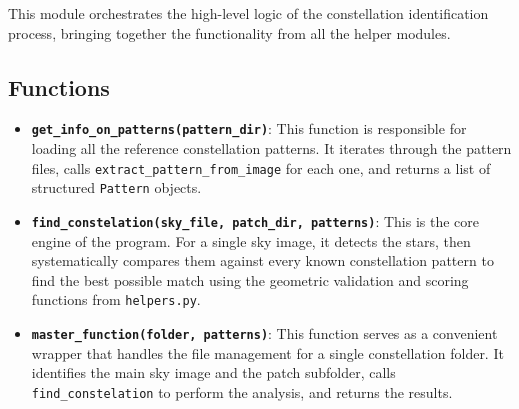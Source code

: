 \documentclass[a4paper,11pt]{article}
\begin{document}
This module orchestrates the high-level logic of the constellation identification process, bringing together the functionality from all the helper modules.

\subsection*{Functions}
\begin{itemize}
	\item \textbf{\texttt{get\_info\_on\_patterns(pattern\_dir)}}: This function is responsible for loading all the reference constellation patterns. It iterates through the pattern files, calls \texttt{extract\_pattern\_from\_image} for each one, and returns a list of structured \texttt{Pattern} objects.
	\item \textbf{\texttt{find\_constelation(sky\_file, patch\_dir, patterns)}}: This is the core engine of the program. For a single sky image, it detects the stars, then systematically compares them against every known constellation pattern to find the best possible match using the geometric validation and scoring functions from \texttt{helpers.py}.
	\item \textbf{\texttt{master\_function(folder, patterns)}}: This function serves as a convenient wrapper that handles the file management for a single constellation folder. It identifies the main sky image and the patch subfolder, calls \texttt{find\_constelation} to perform the analysis, and returns the results.
\end{itemize}


\end{document}
